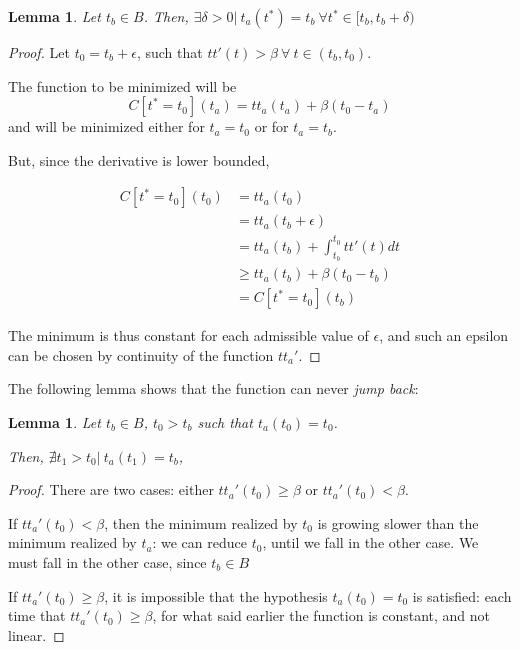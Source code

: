 \documentclass{article}
\newtheorem{lemma}[theorem]{Lemma}
\begin{document}
\begin{lemma}
  Let \(t_b \in B\). Then, \(\exists \delta > 0 |\ t_a(t^*) = t_b \ \forall t^* \in [t_b, t_b + \delta)\)
\end{lemma}
\begin{proof}
  Let \(t_0 = t_b + \epsilon\), such that \(tt'(t) > \beta\ \forall\ t \in (t_b, t_0)\).

  The function to be minimized will be
  \begin{equation*}
    C[t^* = t_0](t_a) = tt_a(t_a) + \beta(t_0 - t_a)
  \end{equation*}
  and will be minimized either for \(t_a = t_0\) or for \(t_a = t_b\).

  But, since the derivative is lower bounded,

  \begin{align*}
    C[t^*=t_0](t_0) & = tt_a(t_0) \\
    & = tt_a(t_b + \epsilon) \\
    & = tt_a(t_b) + \int_{t_b}^{t_0} tt'(t) dt \\
    & \geq tt_a(t_b) + \beta(t_0 - t_b) \\
    & = C[t^* = t_0](t_b)
  \end{align*}

  The minimum is thus constant for each admissible value of \(\epsilon\), and such an epsilon can be chosen by continuity of the function \(tt_a'\).
\end{proof}

The following lemma shows that the function can never \textit{jump back}:

\begin{lemma}
  Let \(t_b \in B\), \(t_0 > t_b\) such that \(t_a(t_0) = t_0\).
  
  Then, \(\nexists t_1 > t_0 |\ t_a(t_1) = t_b\),
\end{lemma}
\begin{proof}
  There are two cases: either \(tt_a'(t_0) \geq \beta\) or \(tt_a'(t_0) < \beta\).

  If  \(tt_a'(t_0) < \beta\), then the minimum realized  by \(t_0\) is growing slower than the minimum realized by \(t_a\): we can reduce \(t_0\), until we fall in the other case. We must fall in the other case, since \(t_b \in B\)

  If \(tt_a'(t_0) \geq \beta\), it is impossible that the hypothesis \(t_a(t_0) = t_0\) is satisfied:
  each time that \(tt_a'(t_0) \geq \beta\), for what said earlier the function is constant, and not linear.
\end{proof}
\end{document}
